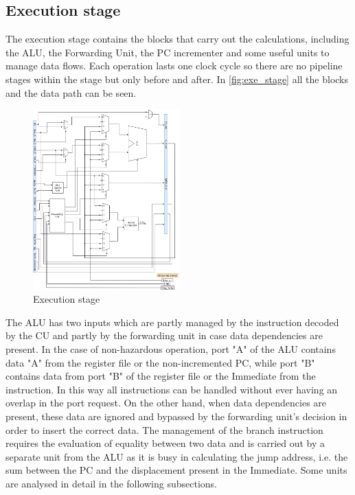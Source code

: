 \subsection{Execution stage}
The execution stage contains the blocks that carry out the calculations, including the ALU, the Forwarding Unit, the PC incrementer and some useful units to manage data flows. Each operation lasts one clock cycle so there are no pipeline stages within the stage but only before and after. In \autoref{fig:exe_stage} all the blocks and the data path can be seen.\\
\begin{figure}[htbp]
	\centering
	\includegraphics[width=0.5\textwidth]{sec2/images/execution_stage.png}
	\caption{Execution stage}
	\label{fig:exe_stage}
\end{figure}
The ALU has two inputs which are partly managed by the instruction decoded by the CU and partly by the forwarding unit in case data dependencies are present. In the case of non-hazardous operation, port "A" of the ALU contains data "A" from the register file or the non-incremented PC, while port "B" contains data from port "B" of the register file or the Immediate from the instruction. In this way all instructions can be handled without ever having an overlap in the port request. On the other hand, when data dependencies are present, these data are ignored and bypassed by the forwarding unit's decision in order to insert the correct data. The management of the branch instruction requires the evaluation of equality between two data and is carried out by a separate unit from the ALU as it is busy in calculating the jump address, i.e. the sum between the PC and the displacement present in the Immediate. Some units are analysed in detail in the following subsections.

